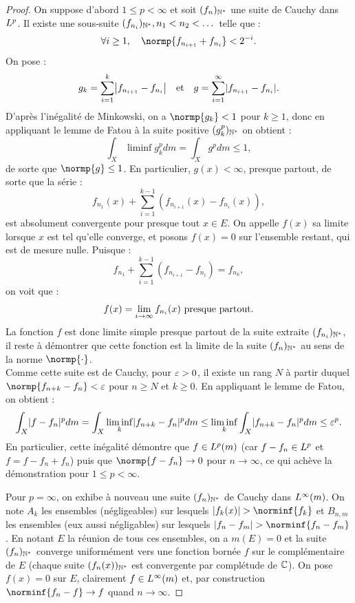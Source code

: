 \begin{proof}
On suppose d'abord $1 \leq p < \infty$ et soit $(f_n)_{\mathbb{N}^\ast}$ une suite de Cauchy dans $L^p$.
Il existe une sous-suite $(f_{n_i})_{\mathbb{N}^\ast}, n_1 < n_2 < \dots$ telle que :
\[ \forall i \geq 1, \quad \normp{f_{n_{i+1}} + f_{n_i}} < 2^{-i} . \]
On pose :
\[ g_k = \sum_{i=1}^k \abs*{f_{n_{i+1}} - f_{n_i}} \et g = \sum_{i=1}^{\infty} \abs{f_{n_{i+1}} - f_{n_i}} . \]
D'après l'inégalité de Minkowski, on a $\normp{g_k} < 1$ pour $k \geq 1$, donc en appliquant le lemme de Fatou à la suite positive
$(g_k^p)_{\mathbb{N}^\ast}$ on obtient :
\[ \int_X \liminf g_k^p dm = \int_X g^p dm \leq 1 , \]
de sorte que $\normp{g} \leq 1$. En particulier, $g(x) < \infty$, presque partout, de sorte que la série :
\[ f_{n_1}(x) + \sum_{i=1}^{k-1} (f_{n_{i+1}}(x) - f_{n_i}(x)) , \]
est absolument convergente pour presque tout $x \in E$. On appelle $f(x)$ sa limite lorsque $x$ est tel qu'elle converge, et posons
$f(x)=0$ sur l'ensemble restant, qui est de mesure nulle. Puisque :
\[ f_{n_1} + \sum_{i=1}^{k-1} (f_{n_{i+1}} - f_{n_i}) = f_{n_k} , \]
on voit que :
\[ f(x) = \lim_{i \to \infty} f_{n_i}(x) \text{~presque partout} . \]
La fonction $f$ est donc limite simple presque partout de la suite extraite $(f_{n_i})_{\mathbb{N}^\ast}$, il reste à démontrer que cette fonction est la 
limite de la suite $(f_n)_{\mathbb{N}^\ast}$ au sens de la norme $\normp{\cdot}$. \\
Comme cette suite est de Cauchy, pour $\varepsilon >0$, il existe un rang $N$ à partir duquel $\normp{f_{n+k}-f_n} < \veps$ 
pour $n \geq N$ et $k \geq 0$. En appliquant le lemme de Fatou, on obtient :
\[ \int_X \lvert f-f_n\rvert^p dm = \int_X \liminf_k \lvert f_{n+k}-f_n\rvert^p dm \leq \liminf_k \int_X \lvert f_{n+k}-f_n\rvert^p dm \leq \varepsilon^p . \]
En particulier, cette inégalité démontre que $f \in L^p(m)$ (car $f-f_n \in L^p$ et $f = f-f_n + f_n$) 
puis que $\normp{f-f_n} \to 0$ pour $n \to \infty$, ce qui achève la démonstration pour $1 \leq p < \infty$. \newline

Pour $p=\infty$, on exhibe à nouveau une suite $(f_n)_{\mathbb{N}^\ast}$ de Cauchy dans $L^{\infty}(m)$. 
On note $A_k$ les ensembles (négligeables) sur lesquels $\abs{f_k(x)} > \norminf{f_k}$ 
et $B_{n,m}$ les ensembles (eux aussi négligables) sur lesquels $\abs{f_n-f_m} > \norminf{f_n-f_m}$. 
En notant $E$ la réunion de tous ces ensembles, on a $m(E) = 0$ et la suite $(f_n)_{\mathbb{N}^\ast}$ converge uniformément vers une fonction
bornée $f$ sur le complémentaire de $E$ (chaque suite $(f_n(x))_{\mathbb{N}^\ast}$ est convergente par complétude de $\mathbb{C}$).
On pose $f(x)=0$ sur $E$, clairement $f \in L^{\infty}(m)$ et, par construction $\norminf{f_n - f} \to f$ quand $n \to \infty$.
\end{proof}

